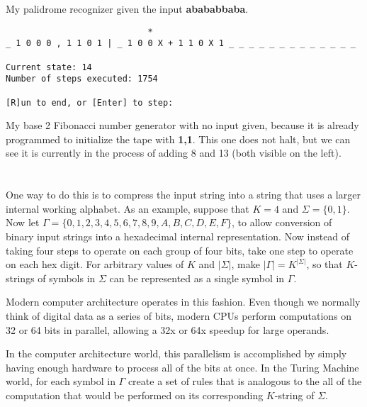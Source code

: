\documentclass{article}
\begin{document}
My palidrome recognizer given the input \textbf{abababbaba}.

\vspace{3em}

\begin{verbatim}
                            *
_ 1 0 0 0 , 1 1 0 1 | _ 1 0 0 X + 1 1 0 X 1 _ _ _ _ _ _ _ _ _ _ _ _ _

Current state: 14
Number of steps executed: 1754

[R]un to end, or [Enter] to step: 
\end{verbatim}

My base 2 Fibonacci number generator with no input given, because it is
already programmed to
initialize the tape with \textbf{1,1}. This one does not halt, but we can
see it is currently in the process of adding 8 and 13 (both visible on the 
left).

\section{}


\section{}
One way to do this is to compress the input string into a string that uses a
larger internal working alphabet.
As an example, suppose that $K = 4$ and $\Sigma = \{0,1\}$. Now let
$\Gamma = \{0,1,2,3,4,5,6,7,8,9,A,B,C,D,E,F\}$, to allow conversion of binary
input strings into a hexadecimal internal representation. Now instead of taking
four steps to operate on each group of four bits, take one step to operate on
each hex digit. For arbitrary values of $K$ and $|\Sigma|$, make
$|\Gamma| = K^{|\Sigma|}$, so that $K$-strings of symbols in $\Sigma$ can be
represented as a single symbol in $\Gamma$. 

\vspace{1em}

Modern computer architecture operates in this fashion. Even though we normally
think of digital data as a series of bits, modern CPUs perform computations on
32 or 64 bits in parallel, allowing a 32x or 64x speedup for large operands.

\vspace{1em}

In the computer architecture world, this parallelism is accomplished by simply
having enough hardware to process all of the bits at once. In
the Turing Machine world, for each symbol in $\Gamma$ create a set of rules
that is analogous to the all of the computation that would be performed on
its corresponding $K$-string of $\Sigma$.
\end{document}
